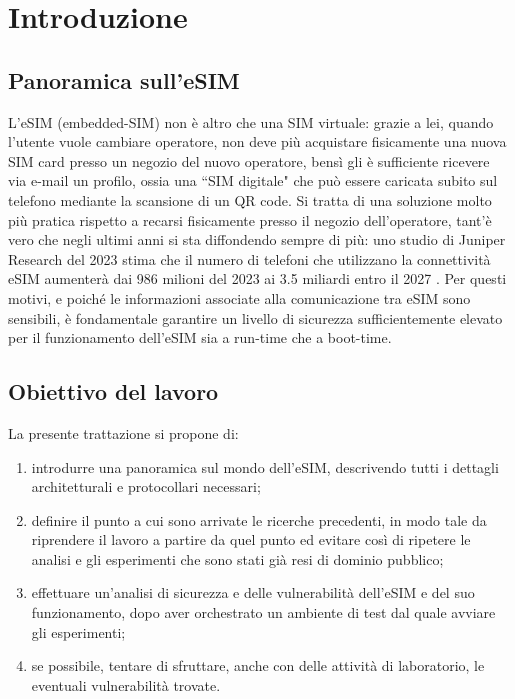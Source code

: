 \documentclass[10pt, oneside]{book}
\begin{document}
\tableofcontents
\listoffigures
\listoftables

\chapter{Introduzione}
\section{Panoramica sull'eSIM}
L'eSIM (embedded-SIM) non è altro che una SIM virtuale: grazie a lei, quando l'utente vuole cambiare operatore, non deve più acquistare fisicamente una nuova SIM card presso un negozio del nuovo operatore, bensì gli è sufficiente ricevere via e-mail un profilo, ossia una ``SIM digitale" che può essere caricata subito sul telefono mediante la scansione di un QR code. Si tratta di una soluzione molto più pratica rispetto a recarsi fisicamente presso il negozio dell'operatore, tant'è vero che negli ultimi anni si sta diffondendo sempre di più: uno studio di Juniper Research del 2023 stima che il numero di telefoni che utilizzano la connettività eSIM aumenterà dai 986 milioni del 2023 ai 3.5 miliardi entro il 2027 \cite{Corcom}. Per questi motivi, e poiché le informazioni associate alla comunicazione tra eSIM sono sensibili, è fondamentale garantire un livello di sicurezza sufficientemente elevato per il funzionamento dell'eSIM sia a run-time che a boot-time.

\section{Obiettivo del lavoro}
La presente trattazione si propone di:
\begin{enumerate}
\item introdurre una panoramica sul mondo dell'eSIM, descrivendo tutti i dettagli architetturali e protocollari necessari;
\item definire il punto a cui sono arrivate le ricerche precedenti, in modo tale da riprendere il lavoro a partire da quel punto ed evitare così di ripetere le analisi e gli esperimenti che sono stati già resi di dominio pubblico;
\item effettuare un'analisi di sicurezza e delle vulnerabilità dell'eSIM e del suo funzionamento, dopo aver orchestrato un ambiente di test dal quale avviare gli esperimenti;
\item se possibile, tentare di sfruttare, anche con delle attività di laboratorio, le eventuali vulnerabilità trovate.
\end{enumerate}
\end{document}
